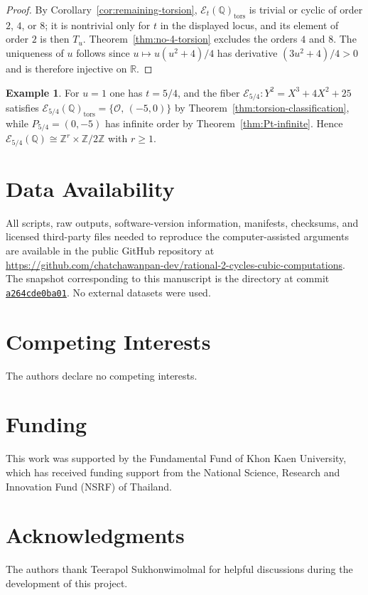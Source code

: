 \documentclass[11pt,a4paper]{amsart}
\theoremstyle{definition}
\newtheorem{example}[theorem]{Example}
\theoremstyle{remark}
\numberwithin{equation}{section}
\newcommand{\Q}{\mathbb{Q}}
\newcommand{\Z}{\mathbb{Z}}
\newcommand{\mathcalE}{\mathcal{E}}
\begin{document}
\begin{proof}
By Corollary~\ref{cor:remaining-torsion}, $\mathcalE_t(\Q)_{\mathrm{tors}}$ is trivial or cyclic of order $2$, $4$, or $8$; it is nontrivial only for $t$ in the displayed locus, and its element of order $2$ is then $T_u$. Theorem~\ref{thm:no-4-torsion} excludes the orders $4$ and $8$. The uniqueness of $u$ follows since $u\mapsto u(u^2+4)/4$ has derivative $(3u^2+4)/4>0$ and is therefore injective on $\mathbb{R}$.
\end{proof}

\begin{example}\label{ex:torsion-classification}
For $u=1$ one has $t=5/4$, and the fiber $\mathcalE_{5/4}:Y^2=X^3+4X^2+25$ satisfies $\mathcalE_{5/4}(\Q)_{\mathrm{tors}}=\{\mathcal O,\,(-5,0)\}$ by Theorem~\ref{thm:torsion-classification}, while $P_{5/4}=(0,-5)$ has infinite order by Theorem~\ref{thm:Pt-infinite}. Hence $\mathcalE_{5/4}(\Q)\cong\Z^r\times\Z/2\Z$ with $r\geq1$.
\end{example}

\section*{Data Availability}
All scripts, raw outputs, software-version information, manifests, checksums,
and licensed third-party files needed to reproduce the computer-assisted
arguments are available in the public GitHub repository at
\url{https://github.com/chatchawanpan-dev/rational-2-cycles-cubic-computations}.
The snapshot corresponding to this manuscript is the directory
 at commit
\href{https://github.com/chatchawanpan-dev/rational-2-cycles-cubic-computations/tree/a264cde0ba01013c3d5d0a7af3252b3294e2b37b/computational_files}{\texttt{a264cde0ba01}}.
No external datasets were used.

\section*{Competing Interests}
The authors declare no competing interests.

\section*{Funding}
This work was supported by the Fundamental Fund of Khon Kaen University,
which has received funding support from the National Science, Research and
Innovation Fund (NSRF) of Thailand.

\section*{Acknowledgments}
The authors thank Teerapol Sukhonwimolmal for helpful discussions during the
development of this project.
\end{document}

